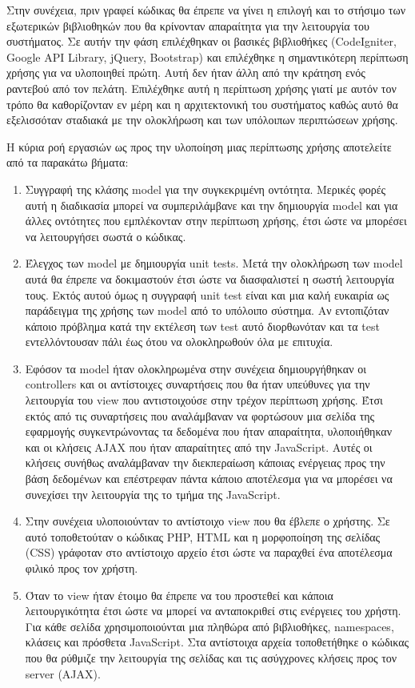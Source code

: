 Στην συνέχεια, πριν γραφεί κώδικας θα έπρεπε να γίνει η επιλογή και το στήσιμο των εξωτερικών βιβλιοθηκών που θα κρίνονταν απαραίτητα για την λειτουργία του συστήματος. Σε αυτήν την φάση επιλέχθηκαν οι βασικές βιβλιοθήκες (CodeIgniter, Google API Library, jQuery, Bootstrap) και επιλέχθηκε η σημαντικότερη περίπτωση χρήσης για να υλοποιηθεί πρώτη. Αυτή δεν ήταν άλλη από την κράτηση ενός ραντεβού από τον πελάτη. Επιλέχθηκε αυτή η περίπτωση χρήσης γιατί με αυτόν τον τρόπο θα καθορίζονταν εν μέρη και η αρχιτεκτονική του συστήματος καθώς αυτό θα εξελισσόταν σταδιακά με την ολοκλήρωση και των υπόλοιπων περιπτώσεων χρήσης.

Η κύρια ροή εργασιών ως προς την υλοποίηση μιας περίπτωσης χρήσης αποτελείτε από τα παρακάτω βήματα:
\begin{enumerate}
\item Συγγραφή της κλάσης model για την συγκεκριμένη οντότητα. Μερικές φορές αυτή η διαδικασία μπορεί να συμπεριλάμβανε και την δημιουργία model και για άλλες οντότητες που εμπλέκονταν στην περίπτωση χρήσης, έτσι ώστε να μπορέσει να λειτουργήσει σωστά ο κώδικας.
\item Έλεγχος των model με δημιουργία unit tests. Μετά την ολοκλήρωση των model αυτά θα έπρεπε να δοκιμαστούν έτσι ώστε να διασφαλιστεί η σωστή λειτουργία τους. Εκτός αυτού όμως η συγγραφή unit test είναι και μια καλή ευκαιρία ως παράδειγμα της χρήσης των model από το υπόλοιπο σύστημα. Αν εντοπιζόταν κάποιο πρόβλημα κατά την εκτέλεση των test αυτό διορθωνόταν και τα test εντελλόντουσαν πάλι έως ότου να ολοκληρωθούν όλα με επιτυχία.
\item Εφόσον τα model ήταν ολοκληρωμένα στην συνέχεια δημιουργήθηκαν οι controllers και οι αντίστοιχες συναρτήσεις που θα ήταν υπεύθυνες για την λειτουργία του view που αντιστοιχούσε στην τρέχον περίπτωση χρήσης. Έτσι εκτός από τις συναρτήσεις που αναλάμβαναν να φορτώσουν μια σελίδα της εφαρμογής συγκεντρώνοντας τα δεδομένα που ήταν απαραίτητα, υλοποιήθηκαν και οι κλήσεις AJAX που ήταν απαραίτητες από την JavaScript. Αυτές οι κλήσεις συνήθως αναλάμβαναν την διεκπεραίωση κάποιας ενέργειας προς την βάση δεδομένων και επέστρεφαν πάντα κάποιο αποτέλεσμα για να μπορέσει να συνεχίσει την λειτουργία της το τμήμα της JavaScript.
\item Στην συνέχεια υλοποιούνταν το αντίστοιχο view που θα έβλεπε ο χρήστης. Σε αυτό τοποθετούταν ο κώδικας PHP, HTML και η μορφοποίηση της σελίδας (CSS) γράφοταν στο αντίστοιχο αρχείο έτσι ώστε να παραχθεί ένα αποτέλεσμα φιλικό προς τον χρήστη.
\item Όταν το view ήταν έτοιμο θα έπρεπε να του προστεθεί και κάποια λειτουργικότητα έτσι ώστε να μπορεί να ανταποκριθεί στις ενέργειες του χρήστη. Για κάθε σελίδα χρησιμοποιούνται μια πληθώρα από βιβλιοθήκες, namespaces, κλάσεις και πρόσθετα JavaScript. Στα αντίστοιχα αρχεία τοποθετήθηκε ο κώδικας που θα ρύθμιζε την λειτουργία της σελίδας και τις ασύγχρονες κλήσεις προς τον server (AJAX). 

\end{enumerate}
